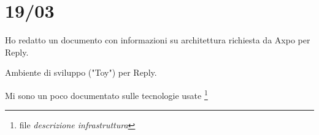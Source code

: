 \section{19/03}
    Ho redatto un documento con informazioni su architettura richiesta da Axpo per Reply.
    
    Ambiente di sviluppo ("Toy") per Reply.
    
    Mi sono un poco documentato sulle tecnologie usate \footnote{file \textit{descrizione infrastruttura}}